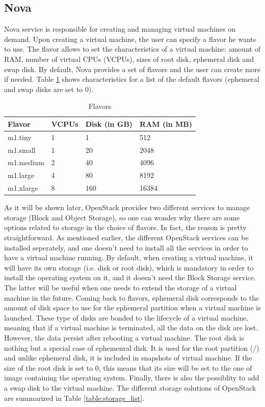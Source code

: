 \subsection{Nova}
Nova service is responsible for creating and managing virtual machines on demand.
Upon creating a virtual machine, the user can specify a flavor he wants to use.
The flavor allows to set the characteristics of a virtual machine: amount of RAM, number of virtual CPUs (VCPUs), sizes of root disk, ephemeral disk and swap disk. By default, Nova provides a set of flavors and the user can create more if needed.
Table \ref{table:flavors_list} shows characteristics for a list of the default flavors (ephemeral and swap disks are set to 0).

\begin{table}[h]
	\centering
	\begin{tabular}{|l|l|l|l|}
		\hline
		\textbf{Flavor} & \textbf{VCPUs} & \textbf{Disk (in GB)} & \textbf{RAM (in MB)}\\
		\hline
		m1.tiny & 1 & 1 & 512 \\
		m1.small & 1 & 20 & 2048 \\
		m1.medium & 2 & 40 & 4096 \\
		m1.large & 4 & 80 & 8192 \\
		m1.xlarge & 8 & 160 & 16384 \\
		\hline
	\end{tabular}
	\caption{Flavors}
	\label{table:flavors_list}
\end{table}

As it will be shown later, OpenStack provides two different services to manage storage (Block and Object Storage), so one can wonder why there are some options related to storage in the choice of flavors. 
In fact, the reason is pretty straightforward.
As mentioned earlier, the different OpenStack services can be installed seperately, and one doesn't need to install all the services in order to have a virtual machine running.
By default, when creating a virtual machine, it will have its own storage (i.e. disk or root disk), which is mandatory in order to install the operating system on it, and it doesn't need the Block Storage service. 
The latter will be useful when one needs to extend the storage of a virtual machine in the future. 
Coming back to flavors, ephemeral disk corresponds to the amount of disk space to use for the ephemeral partition when a virtual machine is launched. 
These type of disks are bonded to the lifecycle of a virtual machine, meaning that if a virtual machine is terminated, all the data on the disk are lost. 
However, the data persist after rebooting a virtual machine. 
The root disk is nothing but a special case of ephemenral disk. 
It is used for the root partition (/) and unlike ephemeral disk, it is included in snapshots of virtual machine. 
If the size of the root disk is set to 0, this means that its size will be set to the one of image containing the operating system.
Finally, there is also the possiblity to add a swap disk to the virtual machine.
The different storage solutions of OpenStack are summarized in Table \ref{table:storage_list}.

